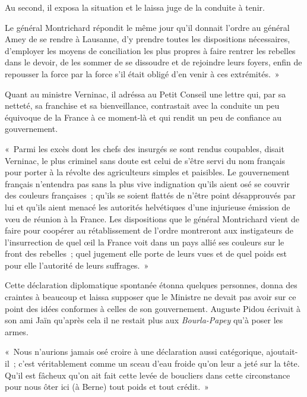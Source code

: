 \documentclass[french,twoside]{book} %
\newenvironment{quoteblock}%
  {\begin{quoting}}
  {\end{quoting}}
\newenvironment{quotebar}{%
    \def\FrameCommand{{\color{rubric!10!}\vrule width 0.5em} \hspace{0.9em}}%
    \def\OuterFrameSep{\itemsep} %
    \MakeFramed {\advance\hsize-\width \FrameRestore}
  }%
  {%
    \endMakeFramed
  }
\renewenvironment{quoteblock}%
  {%
    \savenotes
    \setstretch{0.9}
    \normalfont
    \begin{quotebar}
  }
  {%
    \end{quotebar}
    \spewnotes
  }
\begin{document}
\noindent Au second, il exposa la situation et le laissa juge de la conduite à tenir.\par
Le général Montrichard répondit le même jour qu’il donnait l’ordre au général Amey de se rendre à Lausanne, d’y prendre toutes les dispositions nécessaires, d’employer les moyens de conciliation les plus propres à faire rentrer les rebelles dans le devoir, de les sommer de se dissoudre et de rejoindre leurs foyers, enfin de repousser la force par la force s’il était obligé d’en venir à ces extrémités. »\par
Quant au ministre Verninac, il adréssa au Petit Conseil une lettre qui, par sa netteté, sa franchise et sa bienveillance, contrastait avec la conduite un peu équivoque de la France à ce moment-là et qui rendit un peu de confiance au gouvernement.\par

\begin{quoteblock}
 \noindent « Parmi les excès dont les chefs des insurgés se sont rendus coupables, disait Verninac, le plus criminel sans doute est celui de s’être servi du nom français pour porter à la révolte des agriculteurs simples et paisibles. Le gouvernement français n’entendra pas sans la plus vive indignation qu’ils aient osé se couvrir des couleurs françaises ; qu’ils se soient flattés de n’être point désapprouvés par lui et qu’ils aient menacé les autorités helvétiques d’une injurieuse émission de vœu de réunion à la France. Les dispositions que le général Montrichard vient de faire pour coopérer au rétablissement de l’ordre montreront aux instigateurs de l’insurrection de quel œil la France voit dans un pays allié ses couleurs sur le front des rebelles ; quel jugement elle porte de leurs vues et de quel poids est pour elle l’autorité de leurs suffrages. »
 \end{quoteblock}

\noindent Cette déclaration diplomatique spontanée étonna quelques personnes, donna des craintes à beaucoup et laissa supposer que le Ministre ne devait pas avoir sur ce point des idées conformes à celles de son gouvernement. Auguste Pidou écrivait à son ami Jaïn qu’après cela il ne restait plus aux \emph{Bourla-Papey} qu’à poser les armes.\par

\begin{quoteblock}
 \noindent « Nous n’aurions jamais osé croire à une déclaration aussi catégorique, ajoutait-il ; c’est véritablement comme un sceau d’eau froide qu’on leur a jeté sur la tête. Qu’il est fâcheux qu’on ait fait cette levée de boucliers dans cette circonstance pour nous ôter ici (à Berne) tout poids et tout crédit. »
 \end{quoteblock}
\end{document}
